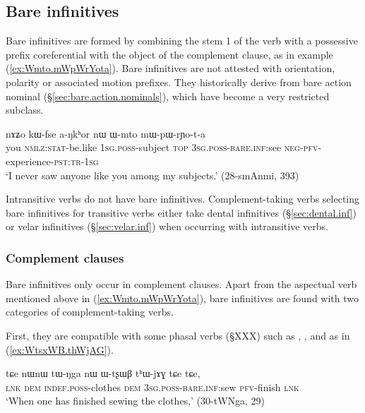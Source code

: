 \subsection{Bare infinitives} \label{sec:bare.inf}
Bare infinitives are formed by combining the stem 1 of the verb with a possessive prefix coreferential with the object of the complement clause, as in example (\ref{ex:Wmto.mWpWrYota}). Bare infinitives are not attested with orientation, polarity or associated motion prefixes. They historically derive from bare action nominal (§\ref{sec:bare.action.nominals}), which have become a very restricted subclass.

\begin{exe} 
\ex \label{ex:Wmto.mWpWrYota}
\gll nɤʑo kɯ-fse a-ŋkʰor nɯ ɯ-mto mɯ-pɯ-rɲo-t-a \\
you \textsc{nmlz:stat}-be.like \textsc{1sg.poss}-subject \textsc{top} \textsc{3sg.poss}-\textsc{bare.inf:}see \textsc{neg-pfv}-experience-\textsc{pst:tr-1sg} \\
\glt `I never saw anyone like you among my subjects.' (28-smAnmi,  393)
\end{exe} 

Intransitive verbs do not have bare infinitives. Complement-taking verbs selecting bare infinitives for transitive verbs either take dental  infinitives (§\ref{sec:dental.inf}) or velar infinitives (§\ref{sec:velar.inf}) when occurring with intransitive verbs.

\subsubsection{Complement clauses} \label{sec:bare.inf.complement}
Bare infinitives only occur in complement clauses. Apart from the aspectual verb  mentioned above in (\ref{ex:Wmto.mWpWrYota}), bare infinitives are found with two categories of complement-taking verbs.

First, they are compatible with some phasal verbs (§XXX) such as , ,  and  as in (\ref{ex:WtsxWB.thWjAG}).

\begin{exe} 
\ex \label{ex:WtsxWB.thWjAG}
\gll  tɕe nɯnɯ tɯ-ŋga nɯ ɯ-tʂɯβ tʰɯ-jɤɣ tɕe tɕe, \\
\textsc{lnk} \textsc{dem} \textsc{indef}.\textsc{poss}-clothes \textsc{dem} \textsc{3sg}.\textsc{poss}-\textsc{bare}.\textsc{inf}:sew \textsc{pfv}-finish \textsc{lnk} \\
\glt `When one has finished sewing the clothes,' (30-tWNga, 29)
\end{exe} 

